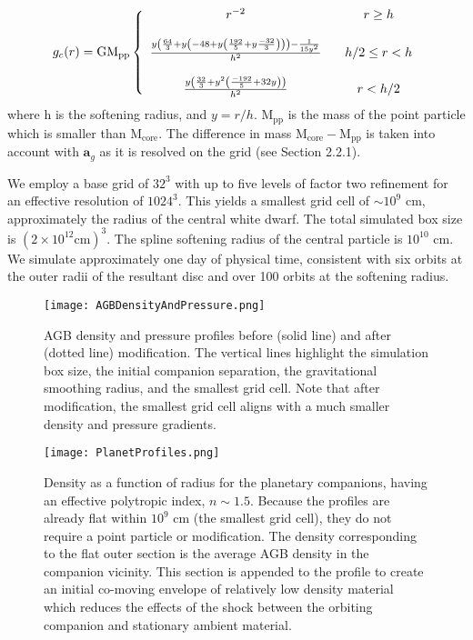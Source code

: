 \documentclass[fleqn,usenatbib]{mnras}
\begin{document}
\begin{align} \label{gc}
g_c(r) = 	\mathrm{G M_{pp}} \left\{ \begin{array}{cc} 
                r^{-2} & \hspace{3mm} r\ge h \\
                \\
                \frac{y\left(\frac{64}{3}+y\left(-48+y\left(\frac{192}{5}+y\frac{-32}{3}\right)\right)\right)-\frac{1}{15y^2}}{h^{2}} & \hspace{3mm} h/2\le r<h \\
                \\
               \frac{y\left(\frac{32}{3}+y^2\left(\frac{-192}{5}+32y\right)\right)}{h^2} & \hspace{3mm} r<h/2 \\
                \end{array} \right.
\end{align}
where h is the softening radius, and $y = r/h$. $\mathrm{M_{pp}}$ is the mass of the point particle which is smaller than $\mathrm{M_{core}}$. The difference in mass $\mathrm{M_{core} - M_{pp}}$ is taken into account with $\textbf{a}_g$ as it is resolved on the grid (see Section 2.2.1).

We employ a base grid of $32^3$ with up to five levels of factor two refinement for an effective resolution of $1024^3$. This yields a smallest grid cell of $\sim$$10^9$ cm, approximately the radius of the central white dwarf. The total simulated box size is $(2\times10^{12} \mathrm{cm})^3$. The spline softening radius of the central particle is $10^{10}$ cm. We simulate approximately one day of physical time, consistent with six orbits at the outer radii of the resultant disc and over 100 orbits at the softening radius.

\begin{figure}
    \texttt{[image: AGBDensityAndPressure.png]} 
    \caption{AGB density and pressure profiles before (solid line) and after (dotted line) modification. The vertical lines highlight the simulation box size, the initial companion separation, the gravitational smoothing radius, and the smallest grid cell. Note that after modification, the smallest grid cell aligns with a much smaller density and pressure gradients.}
    \label{fig:profiles}
\end{figure}


\begin{figure}
    \centering
    \texttt{[image: PlanetProfiles.png]}
    \caption{Density as a function of radius for the planetary companions, having an effective polytropic index, $n \sim 1.5$. Because the profiles are already flat within $10^9$ cm (the smallest grid cell), they do not require a point particle or modification. The density corresponding to the flat outer section is the average AGB density in the companion vicinity. This section is appended to the profile to create an initial co-moving envelope of relatively low density material which reduces the effects of the shock between the orbiting companion and stationary ambient material.}
    \label{fig:planetProfiles}
\end{figure}
\end{document}
